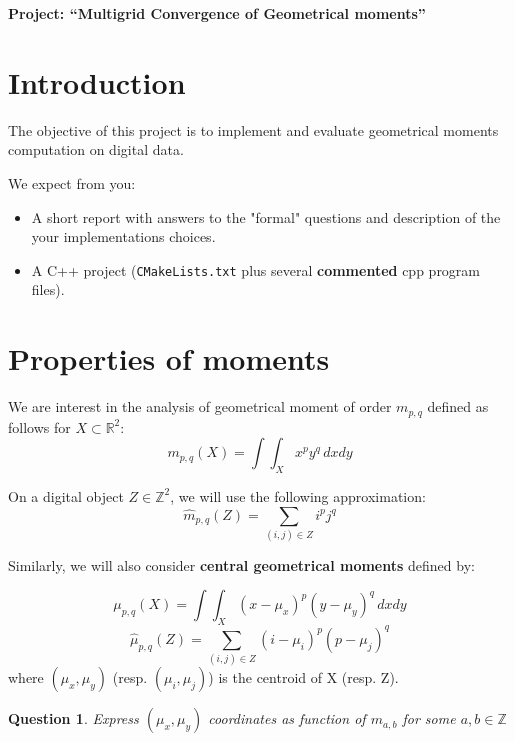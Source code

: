 \documentclass[a4paper, 11pt]{article}
\title{}
\author{}
\date{}
\newtheorem{qu}{Question}
\begin{document}
\begin{center}
	\LARGE \textbf{Project: ``Multigrid Convergence of Geometrical moments''}
\end{center}

\section*{Introduction}

The objective of this project is to implement and evaluate geometrical
moments computation on digital data.


We expect from you:
\begin{itemize}
\item A short report with answers to the "formal" questions and
  description of the your implementations choices.
\item A C++ project (\texttt{CMakeLists.txt} plus several
  \textbf{commented} cpp program files).
\end{itemize}


\section{Properties of moments}
We are interest in the analysis of geometrical moment of order
$m_{p,q}$ defined as follows for $X\subset\mathbb{R}^2$:
\begin{displaymath}
 m_{p,q}(X) = \int\int_X x^py^q\,dxdy
\end{displaymath}

On a digital object $Z\in\mathbb{Z}^2$, we will use the following approximation:
\begin{displaymath}
\hat{m}_{p,q}(Z) = \sum_{(i,j)\in Z} i^pj^q
\end{displaymath} 

Similarly, we will also consider {\bf central geometrical moments} defined by:

\begin{displaymath}
 \mu_{p,q}(X) = \int\int_X (x-\mu_x)^p(y-\mu_y)^q\,dxdy
\end{displaymath}
\begin{displaymath}
 \hat{\mu}_{p,q}(Z) =  \sum_{(i,j)\in Z} (i-\mu_i)^p(p-\mu_j)^q
\end{displaymath}
where $(\mu_x,\mu_y)$ (resp. $(\mu_i,\mu_j)$) is the centroid of X (resp. Z).

\begin{qu}
 Express $(\mu_x,\mu_y)$ coordinates as function of $m_{a,b}$ for some $a,b\in\mathbb{Z}$
\end{qu}
\end{document}
